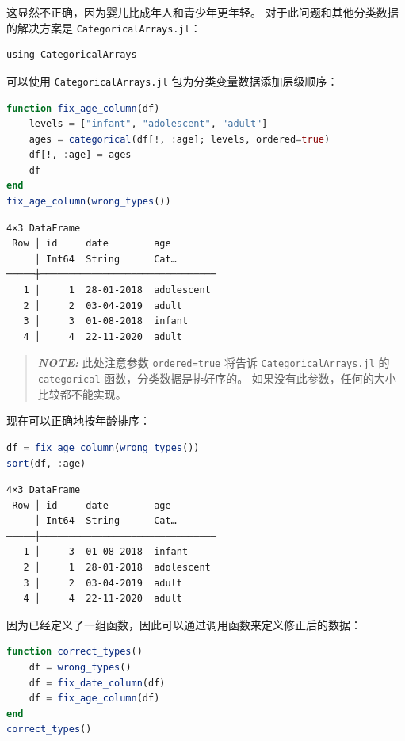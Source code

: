 \documentclass[
  notoc %
]{tufte-book}
\newcommand{\passthrough}[1]{#1}
\begin{document}
这显然不正确，因为婴儿比成年人和青少年更年轻。
对于此问题和其他分类数据的解决方案是
\passthrough{\lstinline!CategoricalArrays.jl!}：

\begin{lstlisting}
using CategoricalArrays
\end{lstlisting}

可以使用 \passthrough{\lstinline!CategoricalArrays.jl!}
包为分类变量数据添加层级顺序：

\begin{lstlisting}[language=Julia]
function fix_age_column(df)
    levels = ["infant", "adolescent", "adult"]
    ages = categorical(df[!, :age]; levels, ordered=true)
    df[!, :age] = ages
    df
end
fix_age_column(wrong_types())
\end{lstlisting}

\begin{lstlisting}[language=Output]
4×3 DataFrame
 Row │ id     date        age
     │ Int64  String      Cat…
─────┼───────────────────────────────
   1 │     1  28-01-2018  adolescent
   2 │     2  03-04-2019  adult
   3 │     3  01-08-2018  infant
   4 │     4  22-11-2020  adult
\end{lstlisting}

\begin{quote}
\textbf{\emph{NOTE:}} 此处注意参数
\passthrough{\lstinline!ordered=true!} 将告诉
\passthrough{\lstinline!CategoricalArrays.jl!} 的
\passthrough{\lstinline!categorical!} 函数，分类数据是排好序的。
如果没有此参数，任何的大小比较都不能实现。
\end{quote}

现在可以正确地按年龄排序：

\begin{lstlisting}[language=Julia]
df = fix_age_column(wrong_types())
sort(df, :age)
\end{lstlisting}

\begin{lstlisting}[language=Output]
4×3 DataFrame
 Row │ id     date        age
     │ Int64  String      Cat…
─────┼───────────────────────────────
   1 │     3  01-08-2018  infant
   2 │     1  28-01-2018  adolescent
   3 │     2  03-04-2019  adult
   4 │     4  22-11-2020  adult
\end{lstlisting}

因为已经定义了一组函数，因此可以通过调用函数来定义修正后的数据：

\begin{lstlisting}[language=Julia]
function correct_types()
    df = wrong_types()
    df = fix_date_column(df)
    df = fix_age_column(df)
end
correct_types()
\end{lstlisting}
\end{document}
